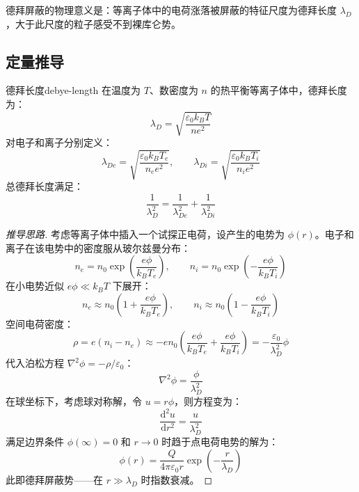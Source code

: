 \documentclass[12pt,a4paper,openany,oneside]{book}
\newcommand{\diff}{\mathrm{d}}
\newcommand{\eps}{\varepsilon}
\newcommand{\vect}[1]{\bm{#1}}
\newcommand{\lap}{\nabla^2}
\begin{document}
德拜屏蔽的物理意义是：等离子体中的电荷涨落被屏蔽的特征尺度为德拜长度 $\lambda_D$，大于此尺度的粒子感受不到裸库仑势。

\begin{center}
\end{center}

\subsection{定量推导}

\begin{theorem}{德拜长度}{debye-length}
在温度为 $T$、数密度为 $n$ 的热平衡等离子体中，德拜长度为：
\[
\lambda_D = \sqrt{\frac{\eps_0 k_B T}{n e^2}}
\label{eq:debye-length}
\]
对电子和离子分别定义：
\[
\lambda_{De} = \sqrt{\frac{\eps_0 k_B T_e}{n_e e^2}}, \qquad \lambda_{Di} = \sqrt{\frac{\eps_0 k_B T_i}{n_i e^2}}
\]
总德拜长度满足：
\[
\frac{1}{\lambda_D^2} = \frac{1}{\lambda_{De}^2} + \frac{1}{\lambda_{Di}^2}
\]
\end{theorem}

\begin{proof}[推导思路]
考虑等离子体中插入一个试探正电荷，设产生的电势为 $\phi(r)$。电子和离子在该电势中的密度服从玻尔兹曼分布：
\[
n_e = n_0 \exp\left(\frac{e\phi}{k_B T_e}\right), \qquad n_i = n_0 \exp\left(-\frac{e\phi}{k_B T_i}\right)
\]
在小电势近似 $e\phi \ll k_B T$ 下展开：
\[
n_e \approx n_0\left(1 + \frac{e\phi}{k_B T_e}\right), \qquad n_i \approx n_0\left(1 - \frac{e\phi}{k_B T_i}\right)
\]
空间电荷密度：
\[
\rho = e(n_i - n_e) \approx -en_0\left(\frac{e\phi}{k_B T_e} + \frac{e\phi}{k_B T_i}\right) = -\frac{\eps_0}{\lambda_D^2}\phi
\]
代入泊松方程 $\lap\phi = -\rho/\eps_0$：
\[
\lap\phi = \frac{\phi}{\lambda_D^2}
\]
在球坐标下，考虑球对称解，令 $u=r\phi$，则方程变为：
\[
\frac{\diff^2 u}{\diff r^2} = \frac{u}{\lambda_D^2}
\]
满足边界条件 $\phi(\infty)=0$ 和 $r\to 0$ 时趋于点电荷电势的解为：
\[
\phi(r) = \frac{Q}{4\pi\eps_0 r} \exp\left(-\frac{r}{\lambda_D}\right)
\]
此即德拜屏蔽势——在 $r \gg \lambda_D$ 时指数衰减。
\end{proof}
\end{document}
